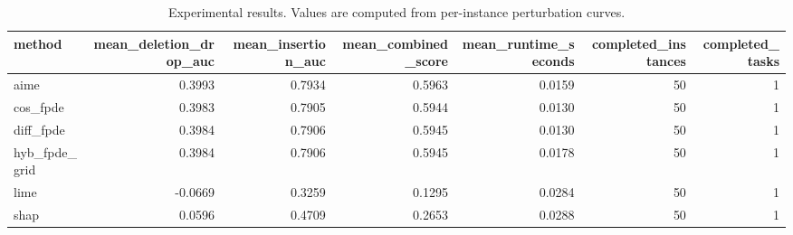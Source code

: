 \begin{table}[t]
\caption{Experimental results. Values are computed from per-instance perturbation curves.}
\label{tab:main_results_computed}
\centering
\begin{tabular}{lrrrrrr}
\toprule
method & mean\_deletion\_drop\_auc & mean\_insertion\_auc & mean\_combined\_score & mean\_runtime\_seconds & completed\_instances & completed\_tasks \\
\midrule
aime & 0.3993 & 0.7934 & 0.5963 & 0.0159 & 50 & 1 \\
cos\_fpde & 0.3983 & 0.7905 & 0.5944 & 0.0130 & 50 & 1 \\
diff\_fpde & 0.3984 & 0.7906 & 0.5945 & 0.0130 & 50 & 1 \\
hyb\_fpde\_grid & 0.3984 & 0.7906 & 0.5945 & 0.0178 & 50 & 1 \\
lime & -0.0669 & 0.3259 & 0.1295 & 0.0284 & 50 & 1 \\
shap & 0.0596 & 0.4709 & 0.2653 & 0.0288 & 50 & 1 \\
\bottomrule
\end{tabular}

\end{table}
